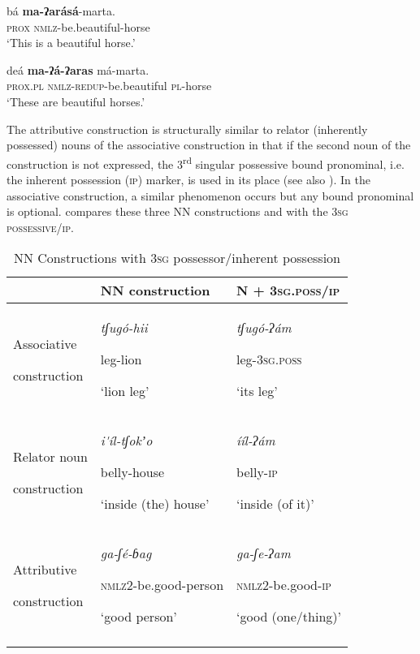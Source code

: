 \documentclass[output=paper]{langsci/langscibook}
\begin{document}
\ea\label{ex:ahlandc:51}
\ea\label{ex:ahlandc:51a}
\gll
bá \textbf{ma-ʔarásá}{}-marta. \\
\textsc{prox}  \textsc{nmlz}-be.beautiful-horse\\
\glt
‘This is a beautiful horse.’

\ex\label{ex:ahlandc:51b}
\gll
deá          \textbf{ma-ʔá-ʔaras}  má-marta. \\
  \textsc{prox.pl}   \textsc{nmlz-redup}{}-be.beautiful  \textsc{pl}{}-horse \\
  \glt
‘These are beautiful horses.’
\z 
\z 

The attributive construction is structurally similar to relator (inherently possessed) nouns of the associative construction in that if the second noun of the construction is not expressed, the 3\textsuperscript{rd} singular possessive bound pronominal, i.e. the inherent possession (\textsc{ip}) marker, is used in its place (see also ). In the associative construction, a similar phenomenon occurs but any bound pronominal is optional.  compares these three NN constructions and with the 3\textsc{sg possessive/ip.}


\begin{table}

\begin{tabularx}{\textwidth}{XXX} 
\lsptoprule
& NN construction & \scshape N + 3sg.poss/ip\\
\midrule

Associative

construction & \textit{tʃug\'{o}-hii} 

leg-lion

‘lion leg’ & \textit{tʃug\'{o}-ʔám} 

leg-\textsc{3sg.poss}

‘its leg’\\
Relator noun 

construction & \textit{i\'{ }íl-tʃokʼo}

belly-house

\mdseries ‘inside (the) house’ & \textit{ííl-ʔám}

belly-\textsc{ip}

\mdseries ‘inside (of it)’\\
Attributive
 
construction & \textit{ga-ʃé-ɓag  }

\textsc{nmlz2-}be.good-person

‘good person’ & \textit{ga{}-ʃe-ʔam}

\textsc{nmlz2-}be.good-\textsc{ip}

‘good (one/thing)’\\
\lspbottomrule
\end{tabularx}
\caption{NN Constructions with \textsc{3sg }possessor/inherent possession}
\label{tab:ahlandc:9}
\end{table}
\end{document}

